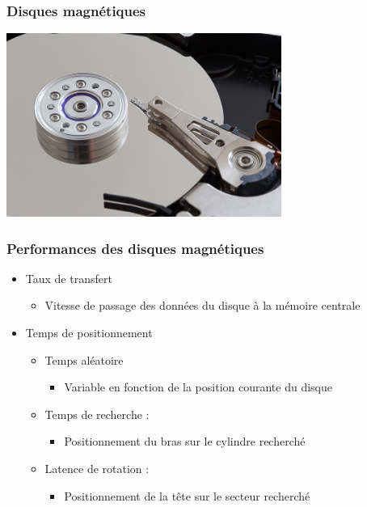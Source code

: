 \begin{frame}
\frametitle{Disques magnétiques}
\includegraphics[height=6cm]{../illustration/disque_dur.jpg}
\end{frame}


\begin{frame}
\frametitle{Performances des disques magnétiques}
\begin{itemize}
\item Taux de transfert
\begin{itemize}
\item Vitesse de passage des données du disque à la mémoire centrale
\end{itemize}
\item Temps de positionnement
\begin{itemize}
\item Temps aléatoire
\begin{itemize}
\item Variable en fonction de la position courante du disque
\end{itemize}


\item Temps de recherche :
\begin{itemize}
\item Positionnement du bras sur le cylindre recherché
\end{itemize}
\item Latence de rotation :
\begin{itemize}
\item Positionnement de la tête sur le secteur recherché
\end{itemize}
\end{itemize}
\end{itemize}
\end{frame}


